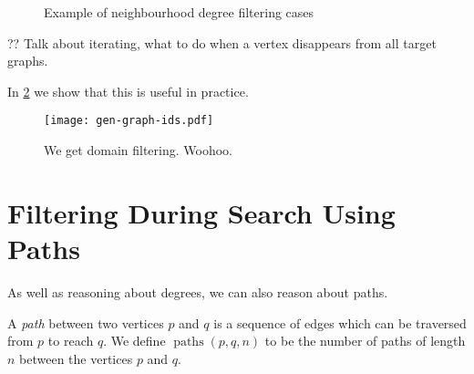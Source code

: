 \documentclass[letterpaper]{article}
\theoremstyle{definition}
\newcommand{\paths}{\operatorname{paths}}
\newcommand{\todo}[1]{{\color{red} {?? [}{#1}{]}}}
\begin{document}
\begin{figure}
    \begin{center}
        \caption{Example of neighbourhood degree filtering cases}
        \label{fig:nds}
    \end{center}
\end{figure}

?? Talk about iterating, what to do when a vertex disappears from all target graphs.

In \cref{figure:ids} we show that this is useful in practice.

\begin{figure}
    \texttt{[image: gen-graph-ids.pdf]}
    \caption{We get domain filtering. Woohoo.}\label{figure:ids}
\end{figure}

\section{Filtering During Search Using Paths}\label{section:pathfiltering}

As well as reasoning about degrees, we can also reason about paths.

A \emph{path} between two vertices $p$ and $q$ is a sequence of edges which can be traversed from $p$ to reach $q$. We define $\paths(p,q,n)$ to be the number of paths of length $n$ between the vertices $p$ and $q$.
\end{document}
